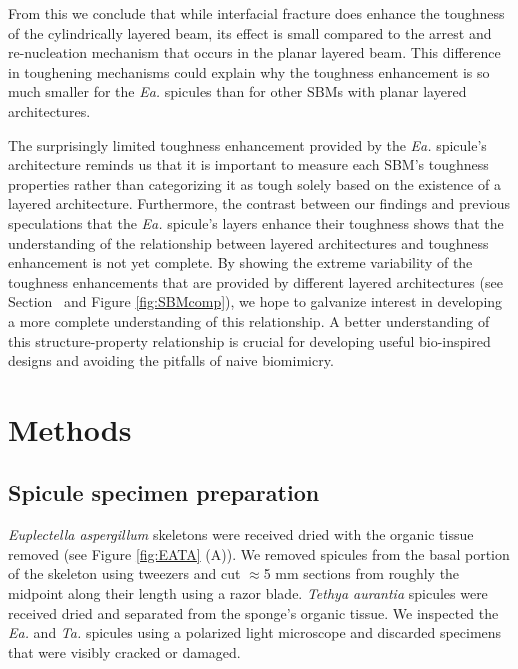 \documentclass[12pt,onecolumn]{article}
\makeatletter
\DeclareRobustCommand*{\nameref}[1]{%
      \emph{\myorg@nameref{#1}}%
    }%
\newcommand{\TA}{\textit{Ta.\@}\xspace}
\newcommand{\EA}{\textit{Ea.\@}\xspace}
\makeatother
\begin{document}
From this we conclude that while interfacial fracture does enhance the toughness of the cylindrically layered beam, its effect is small compared to the arrest and re-nucleation mechanism that occurs in the planar layered beam. This difference in toughening mechanisms could explain why the toughness enhancement is so much smaller for the \EA spicules than for other SBMs with planar layered architectures.
	
The surprisingly limited toughness enhancement provided by the \EA spicule's architecture reminds us that it is important to measure each SBM's toughness properties rather than categorizing it as tough solely based on the existence of a layered architecture. Furthermore, the contrast between our findings and previous speculations that the \EA spicule's layers enhance their toughness shows that the understanding of the relationship between layered architectures and toughness enhancement is not yet complete. By showing the extreme variability of the toughness enhancements that are provided by different layered architectures (see Section~\nameref{sec:Rcomp} and Figure \ref{fig:SBMcomp}), we hope to galvanize interest in developing a more complete understanding of this relationship. A better understanding of this structure-property relationship is crucial for developing useful bio-inspired designs and avoiding the pitfalls of naive biomimicry. 


\section*{Methods}
\label{sec:methods}

\subsection*{Spicule specimen preparation}
\label{sec:sampleprep}
\textit{Euplectella aspergillum} skeletons were received dried with the organic tissue removed (see Figure \ref{fig:EATA} (A)). We removed spicules from the basal portion of the skeleton using tweezers and cut $\approx$5 mm sections from roughly the midpoint along their length using a razor blade. \textit{Tethya aurantia} spicules were received dried and separated from the sponge's organic tissue. We inspected the \EA and \TA spicules using a polarized light microscope and discarded specimens that were visibly cracked or damaged. 
\end{document}
